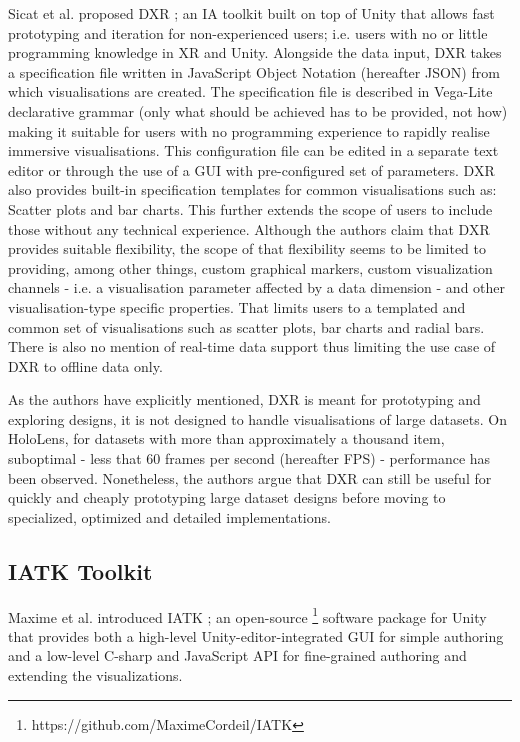 \documentclass{vgtc}                          %
\begin{document}
Sicat et al. proposed DXR \cite{dxr_toolkit}; an IA toolkit built on top of Unity
that allows fast prototyping and iteration for non-experienced users; i.e.
users with no or little programming knowledge in XR and Unity.
Alongside the data input, DXR takes a specification file written in JavaScript
Object Notation (hereafter JSON) from which visualisations are created.
The specification file is described in Vega-Lite declarative grammar \cite{vega_lite}
(only what should be achieved has to be provided, not how) making it suitable
for users with no programming experience to rapidly realise immersive
visualisations. This configuration file can be edited in a separate text editor or through
the use of a GUI with pre-configured set of parameters. DXR also provides
built-in specification templates for common visualisations such as: Scatter
plots and bar charts. This further extends the scope of users to include
those without any technical experience. Although the authors claim that DXR
provides suitable flexibility, the scope of that flexibility seems to be
limited to providing, among other things, custom graphical markers, custom
visualization channels - i.e. a visualisation parameter affected by a
data dimension - and other visualisation-type specific properties. That limits users to a
templated and common set of visualisations such as scatter plots, bar charts
and radial bars. There is also no mention of real-time data support thus
limiting the use case of DXR to offline data only.

\smallskip

\noindent As the authors have explicitly mentioned, DXR is meant for
prototyping and exploring designs, it is not designed to handle visualisations
of large datasets. On HoloLens, for datasets with more than approximately
a thousand item, suboptimal - less that 60 frames per second (hereafter FPS) -
performance has been observed. Nonetheless, the authors argue that DXR can still
be useful for quickly and cheaply prototyping large dataset designs before
moving to specialized, optimized and detailed implementations.

\subsection{IATK Toolkit}
Maxime et al. introduced IATK \cite{iatk_toolkit}; an open-source
\footnote{https://github.com/MaximeCordeil/IATK} software
package for Unity that provides both a high-level Unity-editor-integrated GUI
for simple authoring and a low-level C-sharp and JavaScript API for
fine-grained authoring and extending the visualizations.
\end{document}

